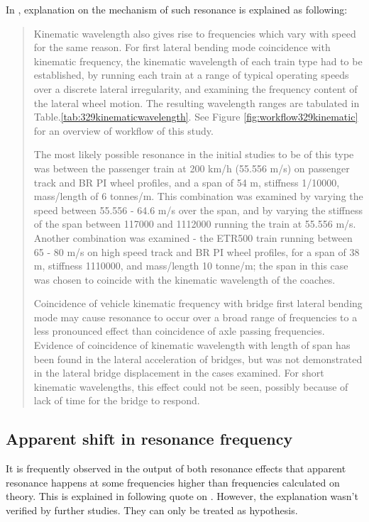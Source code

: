 In \citet[3.4.3]{d181dt329}, explanation on the mechanism of such resonance is explained as following:

\begin{quote}
Kinematic wavelength also gives rise to frequencies which vary with speed for the same reason. For first lateral bending mode coincidence with kinematic frequency, the kinematic wavelength of each train type had to be established, by running each train at a range of typical operating speeds over a discrete lateral irregularity, and examining the frequency content of the lateral wheel motion. The resulting wavelength ranges are tabulated in Table.\ref{tab:329kinematicwavelength}. See Figure \ref{fig:workflow329kinematic} for an overview of workflow of this study.

The most likely possible resonance in the initial studies to be of this type was between the passenger train at 200 km/h (55.556 m/s) on passenger track and BR PI wheel profiles, and a span of 54 m, stiffness 1/10000, mass/length of 6 tonnes/m. This combination was examined by varying the speed between 55.556 - 64.6 m/s over the span, and by varying the stiffness of the span between 117000 and 1112000 running the train at 55.556 m/s. Another combination was examined - the ETR500 train running between 65 - 80 m/s on high speed track and BR PI wheel profiles, for a span of 38 m, stiffness 1110000, and mass/length 10 tonne/m; the span in this case was chosen to coincide with the kinematic wavelength of the coaches.

Coincidence of vehicle kinematic frequency with bridge first lateral bending mode may cause resonance to occur over a broad range of frequencies to a less pronounced effect than coincidence of axle passing frequencies. Evidence of coincidence of kinematic wavelength with length of span has been found in the lateral acceleration of bridges, but was not demonstrated in the lateral bridge displacement in the cases examined. For short kinematic wavelengths, this effect could not be seen, possibly because of lack of time for the bridge to respond.

\end{quote}


\subsection{Apparent shift in resonance frequency}\label{sec:apparentshift}
It is frequently observed in the output of both resonance effects that apparent resonance happens at some frequencies higher than frequencies calculated on theory. This is explained in following quote on \citet[Page 13, Secondary Phase]{d181dt329}. However, the explanation wasn't verified by further studies. They can only be treated as hypothesis.

